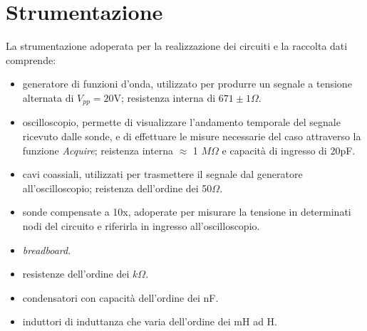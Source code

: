\documentclass{article}
\theoremstyle{definition}
\begin{document}
\section{Strumentazione}
La strumentazione adoperata per la realizzazione dei circuiti e la raccolta dati comprende:
\begin{itemize}
    \item generatore di funzioni d'onda, utilizzato per produrre un segnale a tensione alternata di \(V_{pp} = 20\)V; resistenza interna di \(671 \pm 1 \Omega\).
    \item oscilloscopio, permette di visualizzare l'andamento temporale del segnale ricevuto dalle sonde, e di effettuare le  misure necessarie del caso attraverso la funzione \textit{Acquire}; reistenza interna \(\approx\) 1 \(M\Omega\) e capacità di ingresso di 20pF.
    \item cavi coassiali, utilizzati per trasmettere il segnale dal generatore all'oscilloscopio; reistenza dell'ordine dei 50\(\Omega\).
    \item sonde compensate a 10x, adoperate per misurare la tensione in determinati nodi del circuito e riferirla in ingresso all'oscilloscopio.
    \item \textit{breadboard}.
    \item resistenze dell'ordine dei \(k\Omega\).
    \item condensatori con capacità  dell'ordine dei nF.
    \item induttori di induttanza che varia dell'ordine dei mH ad H.
  
\end{itemize}

\label{sec:PrimaParte}
\end{document}
